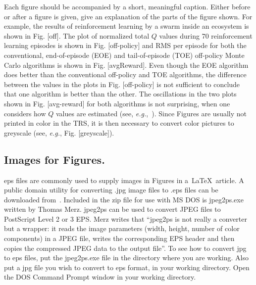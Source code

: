\documentclass{llncs}
\begin{document}
Each figure should be accompanied by a short, meaningful caption.  Either before or after a figure is given, give an explanation of the parts of the figure shown.  For example, the results of reinforcement learning by a swarm inside an ecosystem is shown in Fig. [off].  The plot of normalized total $Q$ values during 70 reinforcement learning episodes is shown in Fig. [off-policy] and RMS per episode for both the conventional, end-of-episode (EOE) and tail-of-episode (TOE) off-policy Monte Carlo algorithms is shown in Fig. [avgReward].  Even though the EOE algorithm does better than the conventional off-policy and TOE algorithms, the difference between the values in the plots in Fig. [off-policy] is not sufficient to conclude that one algorithm is better than the other.   The oscillations in the two plots shown in Fig. [avg-reward] for both algorithms is not surprising, when one considers how $Q$ values are estimated (see, {\em e.g.},~\cite{SB1,PH06}).  Since Figures are usually not printed in color in the TRS, it is then necessary to convert color pictures to greyscale (see, {\em e.g.}, Fig. [greyscale]).

\subsection{Images for Figures.}

\vspace{2mm}
eps files are commonly used to supply images in Figures in a~\LaTeX~article.  A public domain utility for converting .jpg image files to .eps files can be downloaded from~\cite{eps}.  Included in the zip file for use with MS DOS is jpeg2ps.exe written by Thomas Merz.  jpeg2ps can be used to convert JPEG files to PostScript Level 2 or 3 EPS.  Merz writes that ``jpeg2ps is not really a converter but a wrapper: it reads the image parameters
(width, height, number of color components) in a JPEG file, writes the
corresponding EPS header and then copies the compressed JPEG data to the output file''.  To see how to convert jpg to eps files, put the jpeg2ps.exe file in the directory where you are working.  Also put a jpg file you wish to convert to eps format, in your working directory.  Open the DOS Command Prompt window in your working directory.

\end{document}
